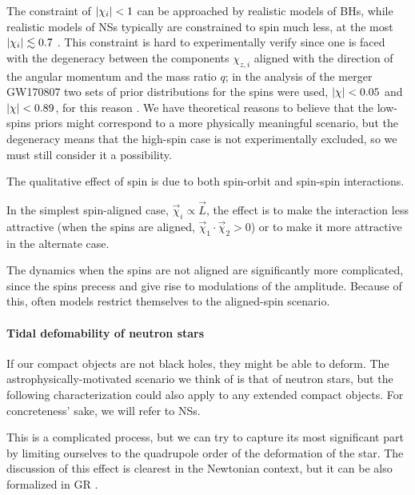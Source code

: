 \documentclass[main.tex]{subfiles}
\begin{document}
The constraint of \(\abs{\chi_i} < 1\) can be approached by realistic models of \acsp{BH}, while realistic models of \acsp{NS} typically are constrained to spin much less, at the most \(\abs{\chi _i} \lesssim 0.7\) \cite{loSpinParameterUniformly2011}.
This constraint is hard to experimentally verify since one is faced with the degeneracy between the components \(\chi_{z,i}\) aligned with the direction of the angular momentum and the mass ratio \(q\); in the analysis of the merger GW170807 two sets of prior distributions for the spins were used, \(\abs{\chi } < 0.05\) and \(\abs{\chi } < 0.89\), for this reason \cite{abbottGW170817ObservationGravitational2017}. We have theoretical reasons to believe that the low-spins priors might correspond to a more physically meaningful scenario, but the degeneracy means that the high-spin case is not experimentally excluded, so we must still consider it a possibility.

The qualitative effect of spin is due to both spin-orbit and spin-spin interactions. 

In the simplest spin-aligned case, \(\vec{\chi}_i \propto \vec{L} \), the effect is to make the interaction less attractive (when the spins are aligned, \(\vec{\chi}_1 \cdot \vec{\chi}_2 > 0\)) or to make it more attractive in the alternate case. 

The dynamics when the spins are not aligned are significantly more complicated, since the spins precess and give rise to modulations of the amplitude. 
Because of this, often models restrict themselves to the aligned-spin scenario. 

\paragraph{Tidal defomability of neutron stars}

If our compact objects are not black holes, they might be able to deform. The astrophysically-motivated scenario we think of is that of neutron stars, but the following characterization could also apply to any extended compact objects. For concreteness' sake, we will refer to \acsp{NS}. 

This is a complicated process, but we can try to capture its most significant part by limiting ourselves to the quadrupole order of the deformation of the star. 
The discussion of this effect is clearest in the Newtonian context, but it can be also formalized in \ac{GR} \cite[section 14.4.1]{maggioreGravitationalWavesVolume2018}.
\end{document}
